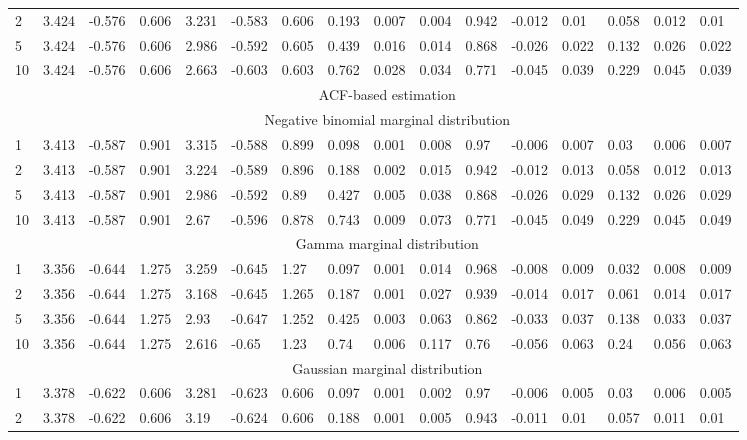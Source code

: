 \documentclass{article}
\theoremstyle{plain}
\theoremstyle{definition}
\theoremstyle{remark}
\begin{document}
\begin{appendix}
{\begin{table}[ht]
\begin{tabular}{l|lll|lll|lll|lll|lll}
  2 & 3.424 & -0.576 & 0.606 & 3.231 & -0.583 & 0.606 & 0.193 & 0.007 & 0.004 & 0.942 & -0.012 & 0.01 & 0.058 & 0.012 & 0.01 \\ 
  5 & 3.424 & -0.576 & 0.606 & 2.986 & -0.592 & 0.605 & 0.439 & 0.016 & 0.014 & 0.868 & -0.026 & 0.022 & 0.132 & 0.026 & 0.022 \\ 
  10 & 3.424 & -0.576 & 0.606 & 2.663 & -0.603 & 0.603 & 0.762 & 0.028 & 0.034 & 0.771 & -0.045 & 0.039 & 0.229 & 0.045 & 0.039 \\ 
		\midrule
		&\multicolumn{15}{c}{ACF-based estimation}\\ \midrule
		&\multicolumn{15}{c}{Negative binomial marginal distribution}\\
1 & 3.413 & -0.587 & 0.901 & 3.315 & -0.588 & 0.899 & 0.098 & 0.001 & 0.008 & 0.97 & -0.006 & 0.007 & 0.03 & 0.006 & 0.007 \\ 
  2 & 3.413 & -0.587 & 0.901 & 3.224 & -0.589 & 0.896 & 0.188 & 0.002 & 0.015 & 0.942 & -0.012 & 0.013 & 0.058 & 0.012 & 0.013 \\ 
  5 & 3.413 & -0.587 & 0.901 & 2.986 & -0.592 & 0.89 & 0.427 & 0.005 & 0.038 & 0.868 & -0.026 & 0.029 & 0.132 & 0.026 & 0.029 \\ 
  10 & 3.413 & -0.587 & 0.901 & 2.67 & -0.596 & 0.878 & 0.743 & 0.009 & 0.073 & 0.771 & -0.045 & 0.049 & 0.229 & 0.045 & 0.049 \\ 
  \midrule
  &\multicolumn{15}{c}{Gamma marginal distribution}\\
 1 & 3.356 & -0.644 & 1.275 & 3.259 & -0.645 & 1.27 & 0.097 & 0.001 & 0.014 & 0.968 & -0.008 & 0.009 & 0.032 & 0.008 & 0.009 \\ 
  2 & 3.356 & -0.644 & 1.275 & 3.168 & -0.645 & 1.265 & 0.187 & 0.001 & 0.027 & 0.939 & -0.014 & 0.017 & 0.061 & 0.014 & 0.017 \\ 
  5 & 3.356 & -0.644 & 1.275 & 2.93 & -0.647 & 1.252 & 0.425 & 0.003 & 0.063 & 0.862 & -0.033 & 0.037 & 0.138 & 0.033 & 0.037 \\ 
  10 & 3.356 & -0.644 & 1.275 & 2.616 & -0.65 & 1.23 & 0.74 & 0.006 & 0.117 & 0.76 & -0.056 & 0.063 & 0.24 & 0.056 & 0.063 \\  
    \midrule
   &\multicolumn{15}{c}{Gaussian marginal distribution}\\
 1 & 3.378 & -0.622 & 0.606 & 3.281 & -0.623 & 0.606 & 0.097 & 0.001 & 0.002 & 0.97 & -0.006 & 0.005 & 0.03 & 0.006 & 0.005 \\ 
  2 & 3.378 & -0.622 & 0.606 & 3.19 & -0.624 & 0.606 & 0.188 & 0.001 & 0.005 & 0.943 & -0.011 & 0.01 & 0.057 & 0.011 & 0.01 \\ 

\end{tabular}
\end{table}}
\end{appendix}
\end{document}
